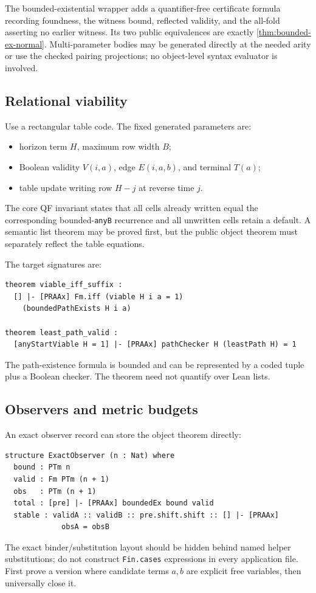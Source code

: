 The bounded-existential wrapper adds a quantifier-free certificate formula recording foundness, the witness bound, reflected validity, and the all-fold asserting no earlier witness.  Its two public equivalences are exactly \cref{thm:bounded-ex-normal}.  Multi-parameter bodies may be generated directly at the needed arity or use the checked pairing projections; no object-level syntax evaluator is involved.

\subsection{Relational viability}

Use a rectangular table code.  The fixed generated parameters are:
\begin{itemize}
  \item horizon term \(H\), maximum row width \(B\);
  \item Boolean validity \(V(i,a)\), edge \(E(i,a,b)\), and terminal \(T(a)\);
  \item table update writing row \(H-j\) at reverse time \(j\).
\end{itemize}
The core QF invariant states that all cells already written equal the corresponding bounded-\texttt{anyB} recurrence and all unwritten cells retain a default.  A semantic list theorem may be proved first, but the public object theorem must separately reflect the table equations.

The target signatures are:

\begin{lstlisting}
theorem viable_iff_suffix :
  [] |- [PRAAx] Fm.iff (viable H i a = 1)
    (boundedPathExists H i a)

theorem least_path_valid :
  [anyStartViable H = 1] |- [PRAAx] pathChecker H (leastPath H) = 1
\end{lstlisting}
The path-existence formula is bounded and can be represented by a coded tuple plus a Boolean checker.  The theorem need not quantify over Lean lists.

\subsection{Observers and metric budgets}

An exact observer record can store the object theorem directly:

\begin{lstlisting}
structure ExactObserver (n : Nat) where
  bound : PTm n
  valid : Fm PTm (n + 1)
  obs   : PTm (n + 1)
  total : [pre] |- [PRAAx] boundedEx bound valid
  stable : validA :: validB :: pre.shift.shift :: [] |- [PRAAx]
             obsA = obsB
\end{lstlisting}
The exact binder/substitution layout should be hidden behind named helper substitutions; do not construct \texttt{Fin.cases} expressions in every application file.  First prove a version where candidate terms \(a,b\) are explicit free variables, then universally close it.

